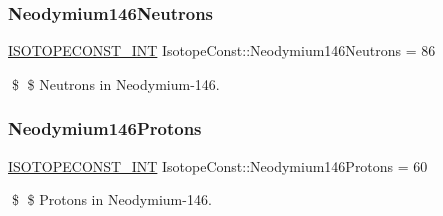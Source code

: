 \subsubsection{\texorpdfstring{Neodymium146\+Neutrons}{Neodymium146Neutrons}}
{\footnotesize\ttfamily \mbox{\hyperlink{group___isotope_const-_macros_ga5f18360b3e99483a35c32d789e62621c}{I\+S\+O\+T\+O\+P\+E\+C\+O\+N\+S\+T\+\_\+\+I\+NT}} Isotope\+Const\+::\+Neodymium146\+Neutrons = 86}

\$ \$ Neutrons in Neodymium-\/146. \mbox{\label{group___isotope_const-_neodymium-_nd146_ga403c0f47b1d79414928f765e48c97a0c}} 
\subsubsection{\texorpdfstring{Neodymium146\+Protons}{Neodymium146Protons}}
{\footnotesize\ttfamily \mbox{\hyperlink{group___isotope_const-_macros_ga5f18360b3e99483a35c32d789e62621c}{I\+S\+O\+T\+O\+P\+E\+C\+O\+N\+S\+T\+\_\+\+I\+NT}} Isotope\+Const\+::\+Neodymium146\+Protons = 60}

\$ \$ Protons in Neodymium-\/146. 